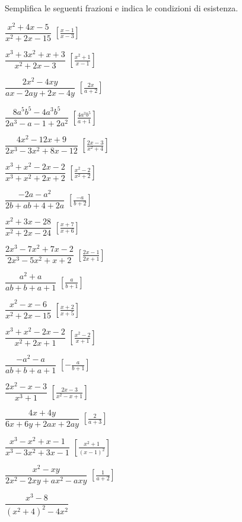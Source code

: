 \begin{esercizio}[\Ast]
\label{ese:19.10}
Semplifica le seguenti frazioni e indica le condizioni di esistenza.
\begin{multicols}{2}
\begin{enumeratea}
 \item \(\dfrac{x^{2}+4x-5}{x^{2}+2x-15}\)
  \hfill \(\left[\frac{x-1}{x-3}\right]\)
 \item \(\dfrac{x^{3}+3x^{2}+x+3}{x^{2}+2x-3}\)
  \hfill \(\left[\frac{x^2+1}{x-1}\right]\)
 \item \(\dfrac{2x^{2}-4xy}{ax-2ay+2x-4y}\)
  \hfill \(\left[\frac{2x}{a+2}\right]\)
 \item \(\dfrac{8a^{5}b^{5}-4a^{3}b^{5}}{2a^{3}-a-1+2a^{2}}\)
  \hfill \(\left[\frac{4a^{3}b^{5}}{a+1}\right]\)
 \item \(\dfrac{4x^{2}-12x+9}{2x^{3}-3x^{2}+8x-12}\)
  \hfill \(\left[\frac{2x-3}{x^{2}+4}\right]\)
 \item \(\dfrac{x^{3}+x^{2}-2x-2}{x^{3}+x^{2}+2x+2}\)
  \hfill \(\left[\frac{x^2-2}{x^2+2}\right]\)
 \item \(\dfrac{-2a-a^{2}}{2b+ab+4+2a}\)
  \hfill \(\left[\frac{-a}{b+2}\right]\)
 \item \(\dfrac{x^{2}+3x-28}{x^{2}+2x-24}\)
  \hfill \(\left[\frac{x+7}{x+6}\right]\)
 \item \(\dfrac{2x^{3}-7x^{2}+7x-2}{2x^{3}-5x^{2}+x+2}\)
  \hfill \(\left[\frac{2x-1}{2x+1}\right]\)
 \item \(\dfrac{a^{2}+a}{ab+b+a+1}\)
  \hfill \(\left[\frac{a}{b+1}\right]\)
 \item \(\dfrac{x^{2}-x-6}{x^{2}+2x-15}\)
  \hfill \(\left[\frac{x+2}{x+5}\right]\)
 \item \(\dfrac{x^{3}+x^{2}-2x-2}{x^{2}+2x+1}\)
  \hfill \(\left[\frac{x^{2}-2}{x+1}\right]\)
 \item \(\dfrac{-a^{2}-a}{ab+b+a+1}\)
  \hfill \(\left[-\frac{a}{b+1}\right]\)
 \item \(\dfrac{2x^{2}-x-3}{x^{3}+1}\)
  \hfill \(\left[\frac{2x-3}{x^2-x+1}\right]\)
 \item \(\dfrac{4x+4y}{6x+6y+2ax+2ay}\)
  \hfill \(\left[\frac{2}{a+3}\right]\)
 \item \(\dfrac{x^{3}-x^{2}+x-1}{x^{3}-3x^{2}+3x-1}\)
  \hfill \(\left[\frac{x^{2}+1}{(x-1)^2}\right]\)
 \item \(\dfrac{x^{2}-xy}{2x^{2}-2xy+ax^{2}-axy}\)
  \hfill \(\left[\frac{1}{a+2}\right]\)
 \item \(\dfrac{x^{3}-8}{\left(x^{2}+4\right)^{2}-4x^{2}}\)

\end{enumeratea}
\end{multicols}
\end{esercizio}
